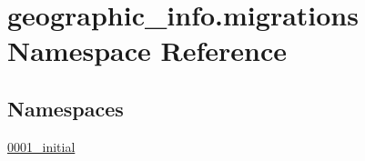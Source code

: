 \hypertarget{namespacegeographic__info_1_1migrations}{\section{geographic\-\_\-info.\-migrations Namespace Reference}
\label{namespacegeographic__info_1_1migrations}
}
\subsection*{Namespaces}
\begin{DoxyCompactItemize}
\item 
\hyperlink{namespacegeographic__info_1_1migrations_1_10001__initial}{0001\-\_\-initial}
\end{DoxyCompactItemize}
